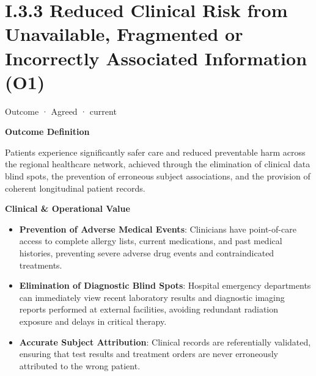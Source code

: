 \section*{I.3.3 Reduced Clinical Risk from Unavailable, Fragmented or Incorrectly Associated Information (O1)}
\label{navigation:I.3.3}

\label{element:0582153fb1f1402b83e5358b61fd60af}
{\small Outcome · Agreed · current}\par

\par\medskip\textbf{Outcome Definition}\par


Patients experience significantly safer care and reduced preventable harm across the regional healthcare network, achieved through the elimination of clinical data blind spots, the prevention of erroneous subject associations, and the provision of coherent longitudinal patient records.



\par\medskip\textbf{Clinical \& Operational Value}\par


\begin{itemize}


\item \textbf{Prevention of Adverse Medical Events}: Clinicians have point-of-care access to complete allergy lists, current medications, and past medical histories, preventing severe adverse drug events and contraindicated treatments.

\item \textbf{Elimination of Diagnostic Blind Spots}: Hospital emergency departments can immediately view recent laboratory results and diagnostic imaging reports performed at external facilities, avoiding redundant radiation exposure and delays in critical therapy.

\item \textbf{Accurate Subject Attribution}: Clinical records are referentially validated, ensuring that test results and treatment orders are never erroneously attributed to the wrong patient.

\end{itemize}


